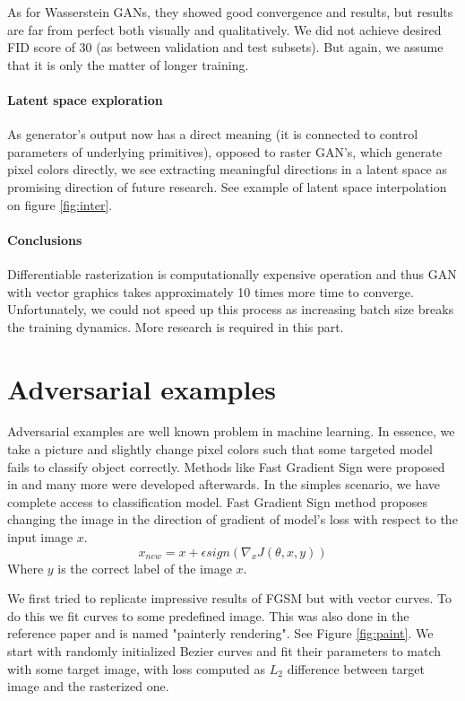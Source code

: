 \documentclass{article}
\begin{document}
	As for Wasserstein GANs, they showed good convergence and results, but results are far from perfect both visually and qualitatively. We did not achieve desired FID score of 30 (as between validation and test subsets). But again, we assume that it is only the matter of longer training.
	
	\paragraph{Latent space exploration} As generator's output now has a direct meaning (it is connected to control parameters of underlying primitives), opposed to raster GAN's, which generate pixel colors directly, we see extracting meaningful directions in a latent space as promising direction of future research. See example of latent space interpolation on figure \ref{fig:inter}.
	
	\paragraph{Conclusions} Differentiable rasterization is computationally expensive operation and thus GAN with vector graphics takes approximately 10 times more time to converge. Unfortunately, we could not speed up this process as increasing batch size breaks the training dynamics. More research is required in this part.
	

\section{Adversarial examples}
Adversarial examples are well known problem in machine learning. In essence, we take a picture and slightly change pixel colors such that some targeted model fails to classify object correctly. Methods like Fast Gradient Sign were proposed in \cite{goodfellow2015explaining} and many more were developed afterwards. In the simples scenario, we have complete access to classification model. Fast Gradient Sign method proposes changing the image in the direction of gradient of model's loss with respect to the input image $x$.
$$x_{new} = x + \epsilon sign(\nabla_x J (\theta, x, y))$$
Where $y$ is the correct label of the image $x$. 

We first tried to replicate impressive results of FGSM but with vector curves. To do this we fit curves to some predefined image. This was also done in the reference paper and is named "painterly rendering". See Figure \ref{fig:paint}. We start with randomly initialized Bezier curves and fit their parameters to match with some target image, with loss computed as $L_2$ difference between target image and the rasterized one.
\end{document}
